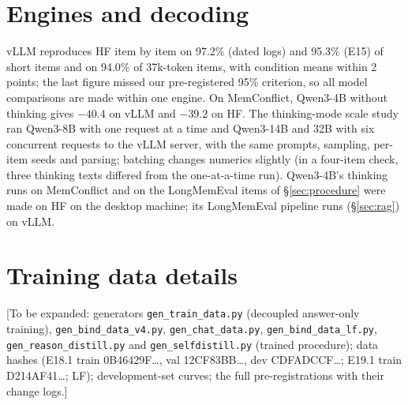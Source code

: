 \documentclass[11pt]{article}
\newcommand{\note}[1]{\textcolor{orange!80!black}{[#1]}}
\begin{document}
\section{Engines and decoding}
\label{app:engines}
vLLM reproduces HF item by item on 97.2\% (dated logs) and 95.3\% (E15) of short items and on 94.0\% of 37k-token items, with condition means within 2 points; the last figure missed our pre-registered 95\% criterion, so all model comparisons are made within one engine. On MemConflict, Qwen3-4B without thinking gives $-40.4$ on vLLM and $-39.2$ on HF. The thinking-mode scale study ran Qwen3-8B with one request at a time and Qwen3-14B and 32B with six concurrent requests to the vLLM server, with the same prompts, sampling, per-item seeds and parsing; batching changes numerics slightly (in a four-item check, three thinking texts differed from the one-at-a-time run). Qwen3-4B's thinking runs on MemConflict and on the LongMemEval items of \S\ref{sec:procedure} were made on HF on the desktop machine; its LongMemEval pipeline runs (\S\ref{sec:rag}) on vLLM.

\section{Training data details}
\label{app:train}
{\sloppy\note{To be expanded: generators \texttt{gen\_train\_data.py} (decoupled answer-only training), \texttt{gen\_bind\_data\_v4.py}, \texttt{gen\_chat\_data.py}, \texttt{gen\_bind\_data\_lf.py}, \texttt{gen\_reason\_distill.py} and \texttt{gen\_selfdistill.py} (trained procedure); data hashes (E18.1 train 0B46429F\ldots, val 12CF83BB\ldots, dev CDFADCCF\ldots; E19.1 train D214AF41\ldots; LF); development-set curves; the full pre-registrations with their change logs.}\par}
\end{document}
